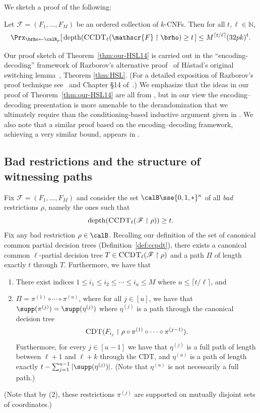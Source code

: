\documentclass{toc}
\theoremstyle{plain}
\newcommand{\uhr}{\upharpoonright}
\newcommand{\CDT}{\textsc{CDT}}
\newcommand{\CCDT}{\textsc{CCDT}}
\newcommand{\depth}{\mathrm{depth}}
\renewcommand{\N}{\mathds{N}}
\begin{document}
We sketch a proof of the following:

\begin{theorem}
\label{thm:our-HSL14}
Let $\mathscr{F} = (F_1,\ldots,F_M)$ be an ordered collection of $k$-CNFs. Then for all $t ,\ell \in \N$,
\[ \Prx_{\brho\leftarrow\calR_p}[\, \depth(\CCDT_\ell(\mathscr{F}\uhr\brho)\ge t\,] \le M^{\lceil t/\ell\rceil} (32pk)^t.  \] 
\end{theorem} 

Our proof sketch of Theorem~\ref{thm:our-HSL14} is carried out in the ``encoding-decoding'' framework of Razborov's alternative proof~\cite{Raz95} of H{\aa}stad's original switching lemma~\cite{Hastad86}, Theorem \ref{thm:HSL}.  (For a detailed exposition of Razborov's proof technique see~\cite{Beame:94,Tha09} and Chapter \S14 of~\cite{AB09}.)
  We emphasize that the ideas in our proof of Theorem~\ref{thm:our-HSL14} are all from \cite{Has14}, but in our view the encoding--decoding presentation is more amenable to the derandomization that we ultimately require than the conditioning-based inductive argument given in \cite{Has14}.  We also note that a similar proof based on the encoding--decoding framework, achieving a very similar bound, appears 
in %
\cite[Section 7]{Tal:15tightbounds}. %





\subsection{Bad restrictions and the structure of witnessing paths} 

Fix $\mathscr{F} = (F_1,\ldots,F_M)$ and consider the set $\calB \sse \{0,1,\ast\}^n$ of all \emph{bad} restrictions $\rho$, namely the ones such that 
\[ \depth(\CCDT_{\ell}(\mathscr{F}\uhr\rho)) \ge t. \] 
Fix any bad restriction $\rho \in \calB$. Recalling our definition of the set of canonical common partial decision trees (Definition~\ref{def:ccpdt}), there exists a canonical common $\ell$-partial decision tree $T \in \CCDT_\ell(\mathscr{F} \uhr \rho)$ and a path $\Pi$ of length exactly $t$ through $T$. Furthermore, we have that 
\begin{enumerate} 
\item There exist indices $1\le i_1 \le i_2 \le \cdots \le i_u \le M$ where $u \le \lceil t/\ell\rceil$, and 
\item $\Pi = \pi^{(1)} \circ \cdots \circ \pi^{(u)}$, where for all $j\in [u]$, we have that $\supp(\pi^{(j)}) =  \supp(\eta^{(j)})$ where  $\eta^{(j)}$ is a path through the canonical decision tree 
\[ \CDT(F_{i_j} \uhr \rho \circ \pi^{(1)}\circ\cdots\circ \pi^{(j-1)}).\]  
Furthermore, for every $j\in [u-1]$ we have that $\eta^{(j)}$ is a full path of length between $\ell+1$ and $\ell+k$ through the CDT, and $\eta^{(u)}$ is a path of length exactly $t - \sum_{j=1}^{u-1} |\supp(\eta^{(j)})|$. (Note that $\eta^{(u)}$ is not necessarily a full path.)
\end{enumerate}  
(Note that by (2), these restrictions $\pi^{(j)}$ are supported on mutually disjoint sets of coordinates.) 
\end{document}
